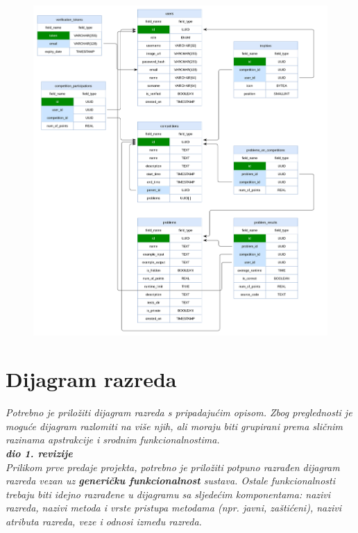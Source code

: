 				\begin{figure}[htbp]
					\centering
					\includegraphics[width=\linewidth]{slike/db_dijagram.png}
				\end{figure}

			\eject
			
			
		\section{Dijagram razreda}
		
			\textit{Potrebno je priložiti dijagram razreda s pripadajućim opisom. Zbog preglednosti je moguće dijagram razlomiti na više njih, ali moraju biti grupirani prema sličnim razinama apstrakcije i srodnim funkcionalnostima.}\\
			
			\textbf{\textit{dio 1. revizije}}\\
			
			\textit{Prilikom prve predaje projekta, potrebno je priložiti potpuno razrađen dijagram razreda vezan uz \textbf{generičku funkcionalnost} sustava. Ostale funkcionalnosti trebaju biti idejno razrađene u dijagramu sa sljedećim komponentama: nazivi razreda, nazivi metoda i vrste pristupa metodama (npr. javni, zaštićeni), nazivi atributa razreda, veze i odnosi između razreda.}\\
			
